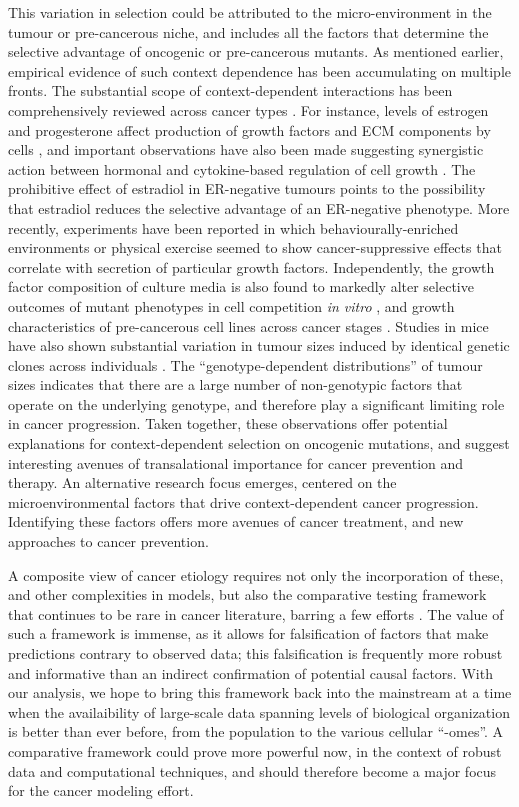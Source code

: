 \documentclass[10pt,twocolumn,twoside]{article}
\begin{document}
This variation in selection could be attributed to the micro-environment in the tumour or pre-cancerous niche, and includes all the factors that determine the selective advantage of oncogenic or pre-cancerous mutants. As mentioned earlier, empirical evidence of such context dependence has been accumulating on multiple fronts. The substantial scope of context-dependent interactions has been comprehensively reviewed across cancer types \cite{Hansen2000,Pietras2010,Hanahan2012,Cabarcas2011a}. For instance, levels of estrogen and progesterone affect production of growth factors and ECM components by cells \cite{Haslam2001,Woodward2000,DICKSON1987}, and important observations have also been made suggesting synergistic action between hormonal and cytokine-based regulation of cell growth \cite{Freund2003}. The prohibitive effect of estradiol in ER-negative tumours \cite{Garcia1992} points to the possibility that estradiol reduces the selective advantage of an ER-negative phenotype. More recently, experiments have been reported in which behaviourally-enriched environments or physical exercise seemed to show cancer-suppressive effects \cite{Cao2010,Rundqvist2013} that correlate with secretion of particular growth factors. Independently, the growth factor composition of culture media is also found to markedly alter selective outcomes of mutant phenotypes in cell competition \textit{in vitro} \cite{Archetti2015}, and growth characteristics of pre-cancerous cell lines across cancer stages \cite{Chan2014}. Studies in mice have also shown substantial variation in tumour sizes induced by identical genetic clones across individuals \cite{Rogers2017}. The ``genotype-dependent distributions'' of tumour sizes indicates that there are a large number of non-genotypic factors that operate on the underlying genotype, and therefore play a significant limiting role in cancer progression. Taken together, these observations offer potential explanations for context-dependent selection on oncogenic mutations, and suggest interesting avenues of transalational importance for cancer prevention and therapy. An alternative research focus emerges, centered on the microenvironmental factors that drive context-dependent cancer progression. Identifying these factors offers more avenues of cancer treatment, and new approaches to cancer prevention.

A composite view of cancer etiology requires not only the incorporation of these, and other complexities in models, but also the comparative testing framework that continues to be rare in cancer literature, barring a few efforts \cite{Frank2007}. The value of such a framework is immense, as it allows for falsification of factors that make predictions contrary to observed data; this falsification is frequently more robust and informative than an indirect confirmation of potential causal factors. With our analysis, we hope to bring this framework back into the mainstream at a time when the availaibility of large-scale data spanning levels of biological organization is better than ever before, from the population to the various cellular ``-omes''. A comparative framework could prove more powerful now, in the context of robust data and computational techniques, and should therefore become a major focus for the cancer modeling effort.
\end{document}
